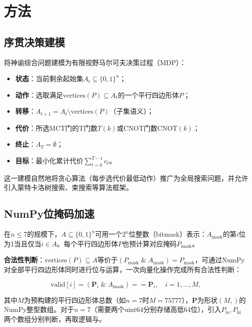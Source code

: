 \documentclass[10.5pt,compsoc,UTF8]{CjC}
\theoremstyle{mystyle}
\begin{document}

\section{\heiti 方法}

\subsection{\heiti 序贯决策建模}

将神谕综合问题建模为有限视野马尔可夫决策过程（MDP）：

\begin{itemize}[noitemsep]
    \item \textbf{状态}：当前剩余起始集$A_t\subseteq\{0,1\}^n$；
    \item \textbf{动作}：选取满足$\text{vertices}(P)\subseteq A_t$的一个平行四边形体$P$；
    \item \textbf{转移}：$A_{t+1} = A_t\setminus\text{vertices}(P)$（子集语义）；
    \item \textbf{代价}：所选MCT门的T门数$T(k)$或CNOT门数$\text{CNOT}(k)$；
    \item \textbf{终止}：$A_T = \emptyset$；
    \item \textbf{目标}：最小化累计代价$\sum_{t=0}^{T-1} c_t$。
\end{itemize}

这一建模自然地将贪心算法（每步选代价最低动作）推广为全局搜索问题，并允许引入蒙特卡洛树搜索、束搜索等算法框架。

\subsection{\heiti NumPy位掩码加速}

在$n\le7$的规模下，$A\subseteq\{0,1\}^n$可用一个$2^n$位整数（bitmask）表示：$A_{\text{mask}}$的第$i$位为1当且仅当$i\in A$。每个平行四边形体$P$也预计算对应掩码$P_{\text{mask}}$。

\textbf{合法性判断}：$\text{vertices}(P)\subseteq A$等价于$(P_{\text{mask}}\;\&\;A_{\text{mask}}) = P_{\text{mask}}$，可通过NumPy对全部平行四边形体同时进行位与运算，一次向量化操作完成所有合法性判断：

\begin{equation}
    \text{valid}[i] = (\mathbf{P}_i \;\&\; A_{\text{mask}}) == \mathbf{P}_i, \quad i=1,\ldots,M,
\end{equation}

其中$M$为预构建的平行四边形体总数（如$n=7$时$M=75777$），$\mathbf{P}$为形状$(M,)$的NumPy整型数组。对于$n=7$（需要两个uint64分别存储高低64位），引入$P_{\text{lo}}, P_{\text{hi}}$两个数组分别判断，再取逻辑与。
\end{document}
